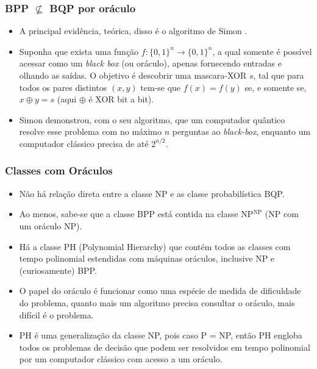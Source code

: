 \documentclass{beamer}
\begin{document}
\begin{frame}
\frametitle{BPP $\not \subseteq$ BQP por oráculo} 
\begin{itemize}
   \item A principal evidência, teórica, disso é o algoritmo de Simon
   \cite{si:94}.
   \item Suponha que exista uma função
   $f:\{0, 1\}^n \rightarrow \{0, 1\}^n$, a qual somente é possível
   acessar como um \textit{black box} (ou oráculo), apenas fornecendo
   entradas e olhando as saídas. O objetivo é descobrir uma
   mascara-XOR $s$, tal que para todos os pares distintos $(x, y)$
   tem-se que $f(x)=f(y)$ se, e somente se, $x \oplus y = s$ (aqui
   $\oplus$ é XOR bit a bit).
   \item Simon demonstrou, com o seu algoritmo, que um computador
   quântico resolve esse problema com no máximo $n$ perguntas ao
   \textit{black-box}, enquanto um computador clássico precisa de até
   $2^{n/2}$.
\end{itemize}
\end{frame}

\begin{frame}
\frametitle{Classes com Oráculos} 
\begin{itemize}
  \item Não há relação direta entre a classe NP e
  as classe probabilística BQP.
  \item Ao menos, sabe-se que a classe BPP está contida na classe
  NP$^{\text{NP}}$ (NP com um oráculo NP).
  \item Há a classe PH (Polynomial Hierarchy) que contém todos as
  classes com tempo polinomial estendidas com máquinas oráculos,
  inclusive NP e (curiosamente) BPP.
  \item O papel do oráculo é funcionar como uma espécie de
  medida de dificuldade do problema, quanto mais um algoritmo precisa
  consultar o oráculo, mais difícil é o problema.
  \item PH é uma generalização da classe NP, pois caso P = NP, então PH
  engloba todos os problemas de decisão que podem ser resolvidos em
  tempo polinomial por um computador clássico com acesso a um oráculo.
\end{itemize}
\end{frame}
\end{document}
